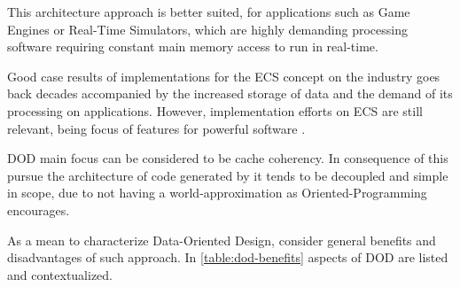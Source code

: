     This architecture approach is better suited, for applications such as Game Engines or Real-Time Simulators, which are highly demanding processing software requiring constant main memory access to run in real-time. 
    
    Good case results of implementations for the ECS concept on the industry goes back decades \cite{leonard-thief-postmortem} accompanied by the increased storage of data and the demand of its processing on applications. However, implementation efforts on ECS are still relevant, being focus of features for powerful software \cite{johansson-ecs-unity-gdc-2018}.

    DOD main focus can be considered to be cache coherency. In consequence of this pursue the architecture of code generated by it tends to be decoupled and simple in scope, due to not having a world-approximation as Oriented-Programming encourages. 
    
    As a mean to characterize Data-Oriented Design, \cite{llopis-game-engine-gems-2} consider general benefits and disadvantages of such approach. In \autoref{table:dod-benefits} aspects of DOD are listed and contextualized.

